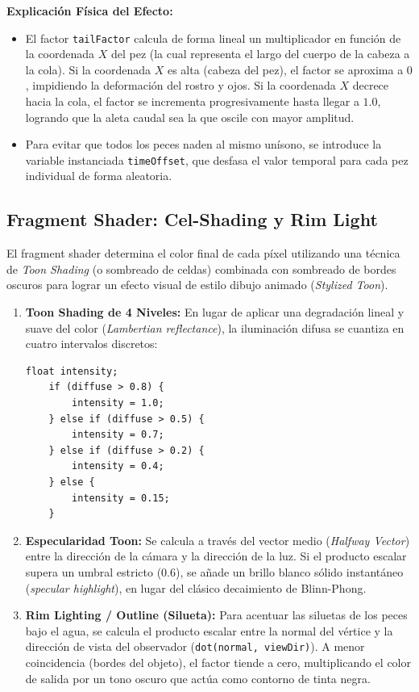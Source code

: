 \documentclass[12pt,a4paper]{article}
\begin{document}
\textbf{Explicación Física del Efecto:}
\begin{itemize}
    \item El factor \texttt{tailFactor} calcula de forma lineal un multiplicador en función de la coordenada $X$ del pez (la cual representa el largo del cuerpo de la cabeza a la cola). Si la coordenada $X$ es alta (cabeza del pez), el factor se aproxima a $0$, impidiendo la deformación del rostro y ojos. Si la coordenada $X$ decrece hacia la cola, el factor se incrementa progresivamente hasta llegar a $1.0$, logrando que la aleta caudal sea la que oscile con mayor amplitud.
    \item Para evitar que todos los peces naden al mismo unísono, se introduce la variable instanciada \texttt{timeOffset}, que desfasa el valor temporal para cada pez individual de forma aleatoria.
\end{itemize}

\subsection{Fragment Shader: Cel-Shading y Rim Light}
El fragment shader determina el color final de cada píxel utilizando una técnica de \textit{Toon Shading} (o sombreado de celdas) combinada con sombreado de bordes oscuros para lograr un efecto visual de estilo dibujo animado (\textit{Stylized Toon}).

\begin{enumerate}
    \item \textbf{Toon Shading de 4 Niveles:} En lugar de aplicar una degradación lineal y suave del color (\textit{Lambertian reflectance}), la iluminación difusa se cuantiza en cuatro intervalos discretos:
    \begin{lstlisting}[style=glslstyle]
    float intensity;
    if (diffuse > 0.8) {
        intensity = 1.0;
    } else if (diffuse > 0.5) {
        intensity = 0.7;
    } else if (diffuse > 0.2) {
        intensity = 0.4;
    } else {
        intensity = 0.15;
    }
    \end{lstlisting}
    
    \item \textbf{Especularidad Toon:} Se calcula a través del vector medio (\textit{Halfway Vector}) entre la dirección de la cámara y la dirección de la luz. Si el producto escalar supera un umbral estricto ($0.6$), se añade un brillo blanco sólido instantáneo (\textit{specular highlight}), en lugar del clásico decaimiento de Blinn-Phong.
    
    \item \textbf{Rim Lighting / Outline (Silueta):} Para acentuar las siluetas de los peces bajo el agua, se calcula el producto escalar entre la normal del vértice y la dirección de vista del observador (\texttt{dot(normal, viewDir)}). A menor coincidencia (bordes del objeto), el factor tiende a cero, multiplicando el color de salida por un tono oscuro que actúa como contorno de tinta negra.
\end{enumerate}
\end{document}
